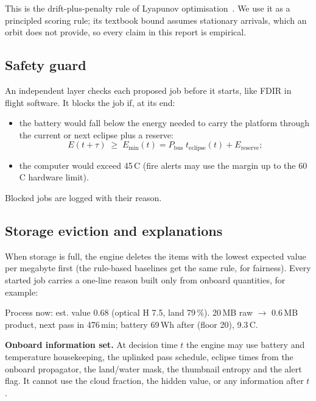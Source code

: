 \documentclass[11pt,a4paper]{article}
\begin{document}
This is the drift-plus-penalty rule of Lyapunov optimisation~\cite{neely}. We use it as a principled scoring
rule; its textbook bound assumes stationary arrivals, which an orbit does not provide, so every claim in
this report is empirical.

\subsection{Safety guard}
An independent layer checks each proposed job before it starts, like FDIR in flight software. It blocks
the job if, at its end:
\begin{itemize}
  \item the battery would fall below the energy needed to carry the platform through the current or next eclipse plus a reserve:
  \begin{equation} E(t+\tau) \;\ge\; E_{\min}(t) = P_{\text{bus}}\; t_{\text{eclipse}}(t) + E_{\text{reserve}} ; \end{equation}
  \item the computer would exceed 45\,\textdegree C (fire alerts may use the margin up to the 60\,\textdegree C hardware limit).
\end{itemize}
Blocked jobs are logged with their reason.

\subsection{Storage eviction and explanations}
When storage is full, the engine deletes the items with the lowest expected value per megabyte first (the
rule-based baselines get the same rule, for fairness). Every started job carries a one-line reason built
only from onboard quantities, for example:

\begin{keybox}
\small\ttfamily Process now: est. value 0.68 (optical H 7.5, land 79\,\%). 20\,MB raw $\rightarrow$ 0.6\,MB product,
next pass in 476\,min; battery 69\,Wh after (floor 20), 9.3\,\textdegree C.
\end{keybox}

\begin{keybox}
\textbf{Onboard information set.} At decision time $t$ the engine may use battery and temperature
housekeeping, the uplinked pass schedule, eclipse times from the onboard propagator, the land/water mask,
the thumbnail entropy and the alert flag. It cannot use the cloud fraction, the hidden value, or any
information after $t$.
\end{keybox}
\end{document}
